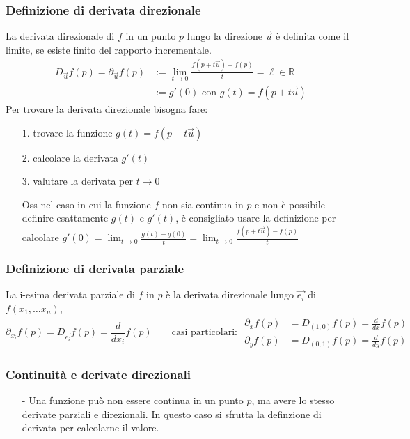 \documentclass[a4paper]{article}
\newcommand\R{\mathbb{R}}     %
\newcommand\dx{\frac{d}{dx}}  %
\newcommand\dy{\frac{d}{dy}}  %
\begin{document}
\subsubsection*{Definizione di derivata direzionale}
La derivata direzionale di \(f\) in un punto \(p\) lungo la direzione \(\vec{u}\) è definita come il limite, se esiste finito
del rapporto incrementale.
\begin{align*}
	D_{\vec{u}} f(p) = \partial_{\vec{u}} f(p) &:= \lim_{t \to 0} \frac{f(p + t \vec{u}) - f(p)}{t} = \ell \in \R \\
	&:= g'(0) \text{ con } g(t) = f(p + t\vec{u})
\end{align*}
Per trovare la derivata direzionale bisogna fare:
\begin{itemize}[topsep=3pt, itemsep=0pt]
	\item[1.] trovare la funzione \(g(t) = f(p+t\vec{u})\)
	\item[2.] calcolare la derivata \(g'(t)\)
	\item[3.] valutare la derivata per \(t \to 0\)
	\item[Oss] nel caso in cui la funzione \(f\) non sia continua in \(p\) e non è possibile definire esattamente \(g(t)\) e \(g'(t)\),
	è consigliato usare la definizione per calcolare \(\displaystyle g'(0) = \lim_{t \to 0} \frac{g(t) - g(0)}{t} = \lim_{t \to 0} \frac{f(p + t \vec{u}) - f(p)}{t}\)
\end{itemize}

\subsubsection*{Definizione di derivata parziale}
La i-esima derivata parziale di \(f\) in \(p\) è la derivata direzionale lungo \(\vec{e_i}\) di \(f(x_1, \dots x_n)\),
\[\partial_{x_i} f(p) = D_{\vec{e_i}} f(p) = \frac{d}{d x_i} f(p) \qquad \text{casi particolari: } \begin{aligned}
	\partial_x f(p) &= D_{(1,0)} f(p) = \dx f(p) \\
	\partial_y f(p) &= D_{(0,1)} f(p) = \dy f(p)
\end{aligned}\]

\subsubsection*{Continuità e derivate direzionali}
\begin{itemize}[topsep=3pt, itemsep=0pt]
	\item[-] Una funzione può non essere continua in un punto \(p\), ma avere lo stesso derivate parziali e direzionali. In questo
	caso si sfrutta la definzione di derivata per calcolarne il valore.
\end{itemize}
\end{document}
